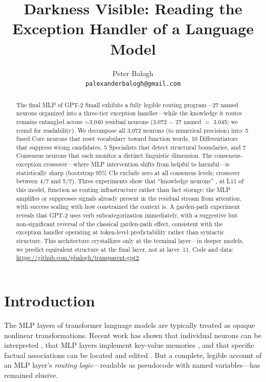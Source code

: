 \documentclass{article}
\title{Darkness Visible: Reading the Exception Handler of a Language Model}
\author{
  Peter Balogh \\
  \texttt{palexanderbalogh@gmail.com}
}
\begin{document}
\maketitle

\begin{abstract}
The final MLP of GPT-2 Small exhibits a fully legible routing
program---27 named neurons organized into a three-tier exception handler---while
the knowledge it routes remains entangled across $\sim$3{,}040 residual neurons
(3{,}072 $-$ 27 named $=$ 3{,}045; we round for readability).
We decompose all 3{,}072 neurons (to numerical precision) into:
5 fused Core neurons that reset vocabulary toward function words,
10 Differentiators that suppress wrong candidates,
5 Specialists that detect structural boundaries, and
7 Consensus neurons that each monitor a distinct linguistic dimension.
The consensus-exception crossover---where MLP intervention shifts from helpful
to harmful---is statistically sharp (bootstrap 95\% CIs exclude zero at
all consensus levels; crossover between 4/7 and 5/7).
Three experiments show that ``knowledge neurons'' \citep{dai2022knowledge},
at L11 of this model, function as routing infrastructure rather than fact
storage: the MLP amplifies or suppresses signals already present in the
residual stream from attention, with success scaling with how constrained
the context is.
A garden-path experiment reveals that GPT-2
uses verb subcategorization immediately, with a suggestive but non-significant
reversal of the classical garden-path effect, consistent with the exception handler
operating at token-level predictability rather than syntactic structure.
This architecture crystallizes only at the terminal layer---in deeper models,
we predict equivalent structure at the final layer, not at layer~11.
Code and data: \url{https://github.com/pbalogh/transparent-gpt2}.
\end{abstract}

\section{Introduction}

The MLP layers of transformer language models are typically treated as opaque
nonlinear transformations.
Recent work has shown that individual neurons can be interpreted
\citep{gurnee2023finding, bricken2023monosemanticity}, that MLP layers implement
key-value memories \citep{geva2021transformer}, and that specific factual
associations can be located and edited \citep{meng2022locating}.
But a complete, legible account of an MLP layer's \emph{routing logic}---readable
as pseudocode with named variables---has remained elusive.
\end{document}
